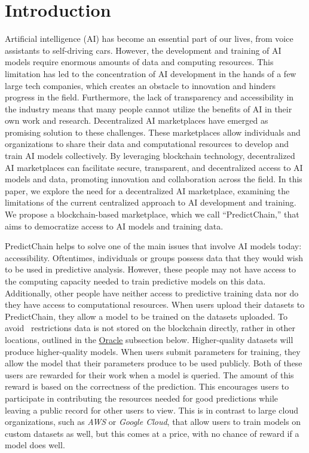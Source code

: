 \documentclass{ledger}
\begin{document}
\section{Introduction}

Artificial intelligence (AI) has become an essential part of our lives, from voice assistants to self-driving cars.
However, the development and training of AI models require enormous amounts of data and computing resources. This
limitation has led to the concentration of AI development in the hands of a few large tech companies, which creates an
obstacle to innovation and hinders progress in the field. Furthermore, the lack of transparency and accessibility in the
industry means that many people cannot utilize the benefits of AI in their own work and research.
Decentralized AI marketplaces have emerged as promising solution to these challenges. These marketplaces allow individuals
and organizations to share their data and computational resources to develop and train AI models collectively. By leveraging
blockchain technology, decentralized AI marketplaces can facilitate secure, transparent, and decentralized access to AI
models and data, promoting innovation and collaboration across the field.
In this paper, we explore the need for a decentralized AI marketplace, examining the limitations of the current
centralized approach to AI development and training. We propose a blockchain-based marketplace, which we call
``PredictChain,'' that aims to democratize access to AI models and training data.

PredictChain helps to solve one of the main issues that involve AI models today: accessibility.
Oftentimes, individuals or groups possess data that they would wish to be used in predictive analysis.
However, these people may not have access to the computing capacity needed to train predictive models on this data.
Additionally, other people have neither access to predictive training data nor do they have access to computational resources.
When users upload their datasets to PredictChain, they allow a model to be trained on the datasets uploaded.  To avoid \
restrictions data is not stored on the blockchain directly, rather in other locations, outlined in the
\hyperref[subsec:oracle]{\underline{Oracle}} subsection below. Higher-quality datasets will produce higher-quality models.
When users submit parameters for training, they allow the model that their parameters produce to be used publicly.
Both of these users are rewarded for their work when a model is queried.  The amount of this reward is based on the
correctness of the prediction.  This encourages users to participate in contributing the resources needed for good
predictions while leaving a public record for other users to view.  This is in contrast to large cloud organizations,
such as \textit{AWS} or \textit{Google Cloud}, that allow users to train models on custom datasets as well, but this
comes at a price, with no chance of reward if a model does well.
\end{document}

